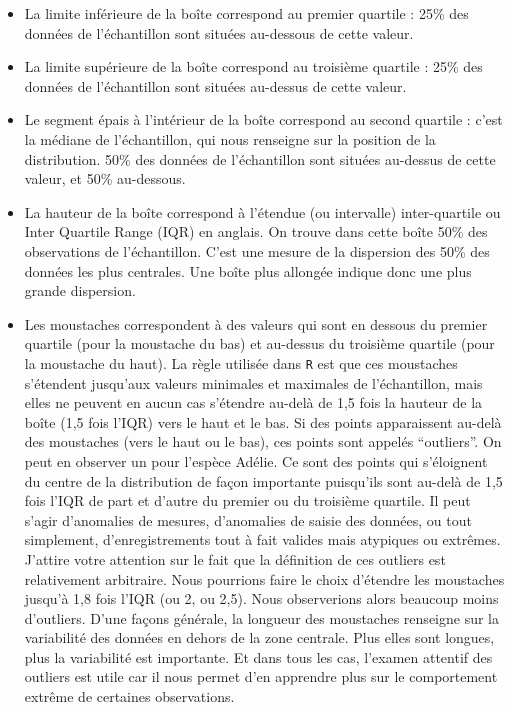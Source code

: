 \documentclass[
  a4paper,
  DIV=11,
  numbers=noendperiod,
  oneside]{scrreprt}
\providecommand{\tightlist}{%
  \setlength{\itemsep}{0pt}\setlength{\parskip}{0pt}}\usepackage{longtable,booktabs,array}
\begin{document}
\begin{itemize}
\tightlist
\item
  La limite inférieure de la boîte correspond au premier quartile : 25\%
  des données de l'échantillon sont situées au-dessous de cette valeur.
\item
  La limite supérieure de la boîte correspond au troisième quartile :
  25\% des données de l'échantillon sont situées au-dessus de cette
  valeur.
\item
  Le segment épais à l'intérieur de la boîte correspond au second
  quartile : c'est la médiane de l'échantillon, qui nous renseigne sur
  la position de la distribution. 50\% des données de l'échantillon sont
  situées au-dessus de cette valeur, et 50\% au-dessous.
\item
  La hauteur de la boîte correspond à l'étendue (ou intervalle)
  inter-quartile ou Inter Quartile Range (IQR) en anglais. On trouve
  dans cette boîte 50\% des observations de l'échantillon. C'est une
  mesure de la dispersion des 50\% des données les plus centrales. Une
  boîte plus allongée indique donc une plus grande dispersion.
\item
  Les moustaches correspondent à des valeurs qui sont en dessous du
  premier quartile (pour la moustache du bas) et au-dessus du troisième
  quartile (pour la moustache du haut). La règle utilisée dans
  \texttt{R} est que ces moustaches s'étendent jusqu'aux valeurs
  minimales et maximales de l'échantillon, mais elles ne peuvent en
  aucun cas s'étendre au-delà de 1,5 fois la hauteur de la boîte (1,5
  fois l'IQR) vers le haut et le bas. Si des points apparaissent au-delà
  des moustaches (vers le haut ou le bas), ces points sont appelés
  ``outliers''. On peut en observer un pour l'espèce Adélie. Ce sont des
  points qui s'éloignent du centre de la distribution de façon
  importante puisqu'ils sont au-delà de 1,5 fois l'IQR de part et
  d'autre du premier ou du troisième quartile. Il peut s'agir
  d'anomalies de mesures, d'anomalies de saisie des données, ou tout
  simplement, d'enregistrements tout à fait valides mais atypiques ou
  extrêmes. J'attire votre attention sur le fait que la définition de
  ces outliers est relativement arbitraire. Nous pourrions faire le
  choix d'étendre les moustaches jusqu'à 1,8 fois l'IQR (ou 2, ou 2,5).
  Nous observerions alors beaucoup moins d'outliers. D'une façons
  générale, la longueur des moustaches renseigne sur la variabilité des
  données en dehors de la zone centrale. Plus elles sont longues, plus
  la variabilité est importante. Et dans tous les cas, l'examen attentif
  des outliers est utile car il nous permet d'en apprendre plus sur le
  comportement extrême de certaines observations.
\end{itemize}
\end{document}
